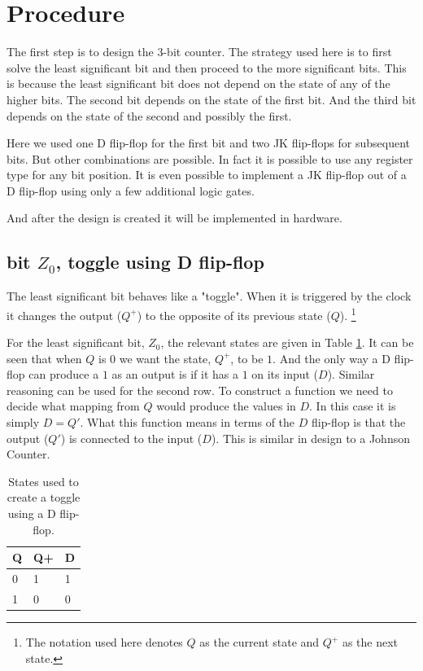 \documentclass[12pt]{article}
\begin{document}
\section{Procedure}
\label{sec:procedure}

The first step is to design the 3-bit counter.
The strategy used here is to first solve the least significant
bit and then proceed to the more significant bits.
This is because the least significant bit does not depend on the
state of any of the higher bits.
The second bit depends on the state of the first bit.
And the third bit depends on the state of the second and
possibly the first.

Here we used one D flip-flop for the first bit and two JK flip-flops
for subsequent bits.
But other combinations are possible.
In fact it is possible to use any register type for any bit position.
It is even possible to implement a JK flip-flop out of a D flip-flop
using only a few additional logic gates.

And after the design is created it will be implemented in hardware.

\subsection{bit $Z_0$, toggle using D flip-flop}
The least significant bit behaves like a "toggle".
When it is triggered by the clock it changes the output ($Q^+$)
to the opposite of its previous state ($Q$).
\footnote{The notation used here denotes $Q$ as the current state and $Q^+$ 
as the next state.}

For the least significant bit, $Z_0$, the relevant states
are given in Table \ref{tbl:dtoggle}.
It can be seen that when $Q$ is $0$ we want the state, $Q^+$,
to be $1$.  And the only way a D flip-flop can produce a $1$ as
an output is if it has a $1$ on its input ($D$).
Similar reasoning can be used for the second row.
To construct a function we need to decide what mapping from $Q$
would produce the values in $D$. 
In this case it is simply $D = Q'$.
What this function means in terms of the $D$ flip-flop is that the
output ($Q'$) is connected to the input ($D$).
This is similar in design to a Johnson Counter.

\begin{table}
\center
\begin{tabular}[t]{l|l|l}
Q & Q+ & D \\
\hline
0 & 1 & 1 \\
1 & 0 & 0
\end{tabular}
\caption{States used to create a toggle using a D flip-flop.}
\label{tbl:dtoggle}
\end{table}
\end{document}
